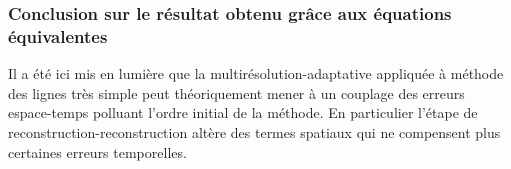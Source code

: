 \subsubsection{Conclusion sur le résultat obtenu grâce aux équations équivalentes}
    Il a été ici mis en lumière que la multirésolution-adaptative appliquée à méthode des lignes très simple
    peut théoriquement mener à un couplage des erreurs espace-temps polluant l'ordre initial de la méthode.
    En particulier l'étape de reconstruction-reconstruction altère des termes spatiaux qui ne compensent plus certaines erreurs temporelles. 
